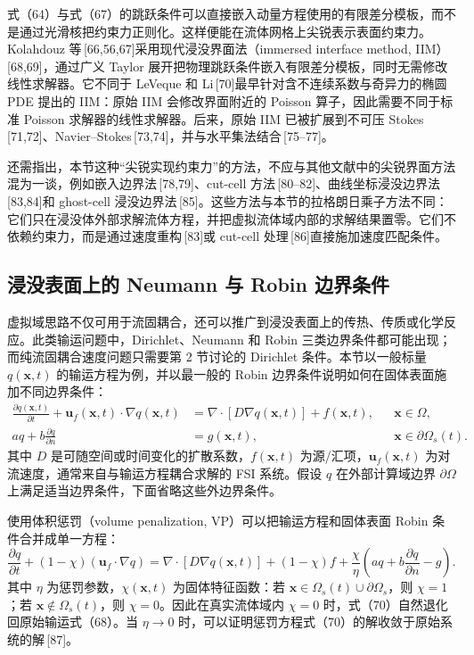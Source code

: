 \documentclass[UTF8,11pt,a4paper]{ctexart}
\begin{document}
式（64）与式（67）的跳跃条件可以直接嵌入动量方程使用的有限差分模板，而不是通过光滑核把约束力正则化。这样便能在流体网格上尖锐表示表面约束力。Kolahdouz 等\,[66,56,67]采用现代浸没界面法（immersed interface method, IIM）\,[68,69]，通过广义 Taylor 展开把物理跳跃条件嵌入有限差分模板，同时无需修改线性求解器。它不同于 LeVeque 和 Li\,[70]最早针对含不连续系数与奇异力的椭圆 PDE 提出的 IIM：原始 IIM 会修改界面附近的 Poisson 算子，因此需要不同于标准 Poisson 求解器的线性求解器。后来，原始 IIM 已被扩展到不可压 Stokes\,[71,72]、Navier--Stokes\,[73,74]，并与水平集法结合\,[75--77]。

还需指出，本节这种“尖锐实现约束力”的方法，不应与其他文献中的尖锐界面方法混为一谈，例如嵌入边界法\,[78,79]、cut-cell 方法\,[80--82]、曲线坐标浸没边界法\,[83,84]和 ghost-cell 浸没边界法\,[85]。这些方法与本节的拉格朗日乘子方法不同：它们只在浸没体外部求解流体方程，并把虚拟流体域内部的求解结果置零。它们不依赖约束力，而是通过速度重构\,[83]或 cut-cell 处理\,[86]直接施加速度匹配条件。

\subsection{浸没表面上的 Neumann 与 Robin 边界条件}

虚拟域思路不仅可用于流固耦合，还可以推广到浸没表面上的传热、传质或化学反应。此类输运问题中，Dirichlet、Neumann 和 Robin 三类边界条件都可能出现；而纯流固耦合速度问题只需要第 2 节讨论的 Dirichlet 条件。本节以一般标量 $q(\bm x,t)$ 的输运方程为例，并以最一般的 Robin 边界条件说明如何在固体表面施加不同边界条件：
\begin{align}
\frac{\partial q(\bm x,t)}{\partial t}
+\bm u_f(\bm x,t)\cdot\nabla q(\bm x,t)
&=\nabla\cdot[D\nabla q(\bm x,t)]+f(\bm x,t), &&\bm x\in\Omega, \tag{68}\\
a q+b\frac{\partial q}{\partial n}
&=g(\bm x,t), &&\bm x\in\partial\Omega_s(t). \tag{69}
\end{align}
其中 $D$ 是可随空间或时间变化的扩散系数，$f(\bm x,t)$ 为源/汇项，$\bm u_f(\bm x,t)$ 为对流速度，通常来自与输运方程耦合求解的 FSI 系统。假设 $q$ 在外部计算域边界 $\partial\Omega$ 上满足适当边界条件，下面省略这些外边界条件。

使用体积惩罚（volume penalization, VP）可以把输运方程和固体表面 Robin 条件合并成单一方程：
\begin{equation}
\frac{\partial q}{\partial t}
+(1-\chi)(\bm u_f\cdot\nabla q)
=\nabla\cdot[D\nabla q(\bm x,t)]+(1-\chi)f
+\frac{\chi}{\eta}\left(aq+b\frac{\partial q}{\partial n}-g\right). \tag{70}
\end{equation}
其中 $\eta$ 为惩罚参数，$\chi(\bm x,t)$ 为固体特征函数：若 $\bm x\in\Omega_s(t)\cup\partial\Omega_s$，则 $\chi=1$；若 $\bm x\notin\Omega_s(t)$，则 $\chi=0$。因此在真实流体域内 $\chi=0$ 时，式（70）自然退化回原始输运式（68）。当 $\eta\to0$ 时，可以证明惩罚方程式（70）的解收敛于原始系统的解\,[87]。
\end{document}
